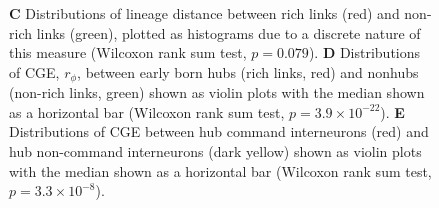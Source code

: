 \documentclass[10pt,letterpaper]{article}
\begin{document}
{\begin{figure}[!h]
{%
\textbf{C} Distributions of lineage distance between rich links (red) and non-rich links (green), plotted as histograms due to a discrete nature of this measure (Wilcoxon rank sum test, $p = 0.079$).
\textbf{D} Distributions of CGE, $r_\phi$, between early born hubs (rich links, red) and nonhubs (non-rich links, green) shown as violin plots with the median shown as a horizontal bar (Wilcoxon rank sum test, $p = 3.9 \times 10^{-22}$).
\textbf{E} Distributions of CGE between hub command interneurons (red) and hub non-command interneurons (dark yellow) shown as violin plots with the median shown as a horizontal bar (Wilcoxon rank sum test, $p = 3.3 \times 10^{-8}$).
}
 \label{fig:OtherInfluences}
\end{figure}

}
\end{document}
